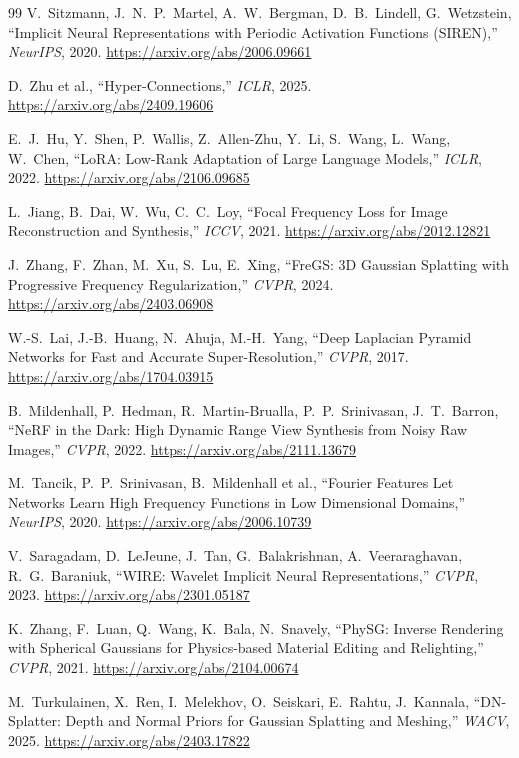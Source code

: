 \begin{thebibliography}{99}
 V.~Sitzmann, J.~N.~P.~Martel, A.~W.~Bergman, D.~B.~Lindell,
G.~Wetzstein, ``Implicit Neural Representations with Periodic Activation Functions
(SIREN),'' \textit{NeurIPS}, 2020. \url{https://arxiv.org/abs/2006.09661}

 D.~Zhu et al., ``Hyper-Connections,'' \textit{ICLR}, 2025.
\url{https://arxiv.org/abs/2409.19606}

 E.~J.~Hu, Y.~Shen, P.~Wallis, Z.~Allen-Zhu, Y.~Li, S.~Wang, L.~Wang,
W.~Chen, ``LoRA: Low-Rank Adaptation of Large Language Models,'' \textit{ICLR},
2022. \url{https://arxiv.org/abs/2106.09685}

 L.~Jiang, B.~Dai, W.~Wu, C.~C.~Loy, ``Focal Frequency Loss for
Image Reconstruction and Synthesis,'' \textit{ICCV}, 2021.
\url{https://arxiv.org/abs/2012.12821}

 J.~Zhang, F.~Zhan, M.~Xu, S.~Lu, E.~Xing, ``FreGS: 3D Gaussian
Splatting with Progressive Frequency Regularization,'' \textit{CVPR}, 2024.
\url{https://arxiv.org/abs/2403.06908}

 W.-S.~Lai, J.-B.~Huang, N.~Ahuja, M.-H.~Yang, ``Deep Laplacian
Pyramid Networks for Fast and Accurate Super-Resolution,'' \textit{CVPR}, 2017.
\url{https://arxiv.org/abs/1704.03915}

 B.~Mildenhall, P.~Hedman, R.~Martin-Brualla, P.~P.~Srinivasan,
J.~T.~Barron, ``NeRF in the Dark: High Dynamic Range View Synthesis from Noisy Raw
Images,'' \textit{CVPR}, 2022. \url{https://arxiv.org/abs/2111.13679}

 M.~Tancik, P.~P.~Srinivasan, B.~Mildenhall et al., ``Fourier
Features Let Networks Learn High Frequency Functions in Low Dimensional Domains,''
\textit{NeurIPS}, 2020. \url{https://arxiv.org/abs/2006.10739}

 V.~Saragadam, D.~LeJeune, J.~Tan, G.~Balakrishnan, A.~Veeraraghavan,
R.~G.~Baraniuk, ``WIRE: Wavelet Implicit Neural Representations,'' \textit{CVPR},
2023. \url{https://arxiv.org/abs/2301.05187}

 K.~Zhang, F.~Luan, Q.~Wang, K.~Bala, N.~Snavely, ``PhySG: Inverse
Rendering with Spherical Gaussians for Physics-based Material Editing and
Relighting,'' \textit{CVPR}, 2021. \url{https://arxiv.org/abs/2104.00674}

 M.~Turkulainen, X.~Ren, I.~Melekhov, O.~Seiskari, E.~Rahtu,
J.~Kannala, ``DN-Splatter: Depth and Normal Priors for Gaussian Splatting and
Meshing,'' \textit{WACV}, 2025. \url{https://arxiv.org/abs/2403.17822}


\end{thebibliography}
